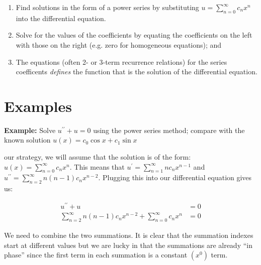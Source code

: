\begin{enumerate}
\item Find solutions in the form of a power series by substituting $u = \sum\limits_{n=0}^{\infty} c_n x^n$ into the differential equation.
\item Solve for the values of the coefficients by equating the coefficients on the left with those on the right (e.g. zero for homogeneous equations); and
\item The equations (often 2- or 3-term recurrence relations) for the series coefficents \emph{defines} the function that is the solution of the differential equation.
\end{enumerate}

\section{Examples}

\noindent\textbf{Example:} Solve $u^{\prime \prime}+u = 0$ using the power series method; compare with the known solution $u(x)=c_0\cos{x}+c_1\sin{x}$

 our strategy, we will assume that the solution is of the form: $u(x)=\sum_{n=0}^{\infty} c_n x^n$.  This means that $u^{\prime} = \sum_{n=1}^{\infty} n c_n x^{n-1}$ and $u^{\prime \prime} = \sum_{n=2}^{\infty} n(n-1)c_nx^{n-2}$.  Plugging this into our differential equation gives us:

\begin{align*}
u^{\prime \prime} + u &= 0 \\
\sum\limits_{n=2}^{\infty} n(n-1)c_nx^{n-2} + \sum\limits_{n=0}^{\infty} c_n x^n &= 0
\end{align*}

\noindent We need to combine the two summations.  It is clear that the summation indexes start at different values but we are lucky in that the summations are already ``in phase'' since the first term in each summation is a constant $(x^0)$ term.

